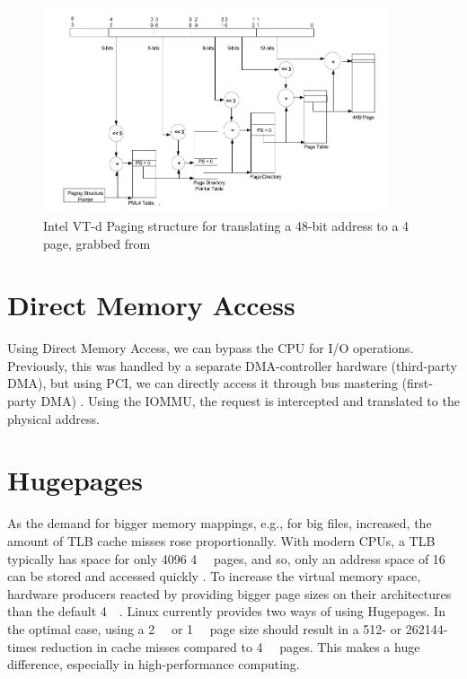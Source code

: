 \begin{figure}[H]
    \centering
    \includegraphics[width=0.9\textwidth]{figures/4kibtranslation.pdf}
    \caption{Intel VT-d Paging structure for translating a 48-bit address to a \qty{4}{\kibi\byte} page, grabbed from \cite{vtdspec}}
    \label{fig:pagewalk}
\end{figure}

\section{Direct Memory Access}
Using Direct Memory Access, we can bypass the CPU for I/O operations. Previously, this was handled by a separate DMA-controller hardware (third-party DMA), but using PCI, we can directly access it through bus mastering (first-party DMA) \cite{maellmann}. Using the IOMMU, the request is intercepted and translated to the physical address.

\section{Hugepages}
As the demand for bigger memory mappings, e.g., for big files, increased, the amount of TLB cache misses rose proportionally. With modern CPUs, a TLB typically has space for only 4096 \qty{4}{\kibi\byte} pages, and so, only an address space of \qty{16}{\mebi\byte} can be stored and accessed quickly \cite{emmerich2019user}. To increase the virtual memory space, hardware producers reacted by providing bigger page sizes on their architectures than the default \qty{4}{\kibi\byte}.
Linux currently provides two ways of using Hugepages.
In the optimal case, using a \qty{2}{\mebi\byte} or \qty{1}{\gibi\byte} page size should result in a 512- or 262144-times reduction in cache misses compared to \qty{4}{\kibi\byte} pages. This makes a huge difference, especially in high-performance computing.

